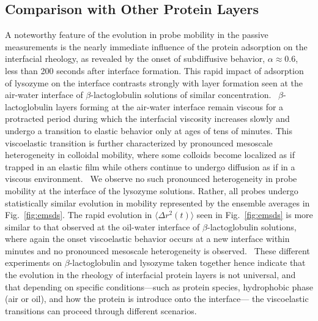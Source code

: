 \subsection{Comparison with Other Protein Layers}

A noteworthy feature of the evolution in probe mobility in the passive measurements is the nearly immediate influence of the protein adsorption on the interfacial rheology, as revealed by the onset of subdiffusive behavior, $\alpha \approx 0.6$, less than 200 seconds after interface formation.  This rapid impact of adsorption of lysozyme on the interface  contrasts strongly with layer formation seen at the air-water interface  of $\beta$-lactoglobulin solutions of similar concentration.~\cite{Lee2010}  $\beta$-lactoglobulin layers forming at the air-water interface  remain viscous for a protracted period during which the interfacial viscosity increases slowly and undergo a  transition to elastic behavior only at ages of tens of minutes.  This viscoelastic transition is further characterized by pronounced mesoscale heterogeneity in colloidal mobility, where some colloids become localized as if trapped in an elastic film while others continue to undergo diffusion as if in a viscous environment.~\cite{Lee2010}  We observe no such pronounced heterogeneity in probe mobility at the interface of the lysozyme solutions.  Rather, all probes undergo statistically similar evolution in mobility represented by the ensemble averages in Fig.~\ref{fig:emsds}.  The rapid evolution in $\langle \Delta r^2(t) \rangle$ seen in Fig.~\ref{fig:emsds} is more similar to that observed at the oil-water interface of $\beta$-lactoglobulin solutions, where again the onset viscoelastic behavior occurs at a new interface within minutes and no pronounced mesoscale heterogeneity is observed.~\cite{Lee2011}  
These different experiments on $\beta$-lactoglobulin and lysozyme taken together hence indicate that the evolution in the rheology of interfacial protein layers is not universal, and that depending on  specific conditions---such as protein species, hydrophobic phase (air or oil), and how the protein is introduce onto the interface--- the viscoelastic transitions can proceed through different scenarios.  

